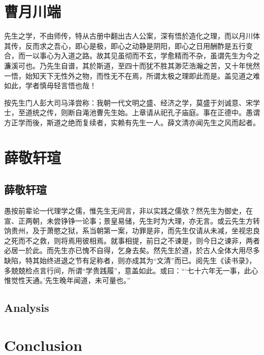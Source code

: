 \documentclass[
    author = Sweet Pastry,
    affiliation = Fudan University,
    column = onecolumn,
    ref = refDemo.bib,
    lang = cn
]{spArticle}
\begin{document}
    \section{曹月川端}
    先生之学，不由师传，特从古册中翻出古人公案，深有悟於造化之理，而以月川体其传，反而求之吾心，即心是极，即心之动静是阴阳，即心之日用酬酢是五行变合，而一以事心为入道之路。故其见虽彻而不玄，学愈精而不杂，虽谓先生为今之濂溪可也。乃先生自谱，其於斯道，至四十而犹不胜其渺茫浩瀚之苦，又十年恍然一悟，始知天下无性外之物，而性无不在焉，所谓太极之理即此而是。盖见道之难如此，学者慎毋轻言悟也哉！

    按先生门人彭大司马泽尝称：我朝一代文明之盛、经济之学，莫盛于刘诚意、宋学士，至道统之传，则断自渑池曹先生始。上章请从祀孔子庙庭。事在正德中。愚谓方正学而後，斯道之绝而复续者，实赖有先生一人。薛文清亦闻先生之风而起者。

    \section{薛敬轩瑄}
        \subsection{薛敬轩瑄}
            愚按前辈论一代理学之儒，惟先生无间言，非以实践之儒欤？然先生为御史，在宣、正两朝，未尝铮铮一论事；景皇易储，先生时为大理，亦无言。或云先生方转饷贵州，及于萧愍之狱，系当朝第一案，功罪是非，而先生仅请从未减，坐视忠良之死而不之救，则将焉用彼相焉。就事相提，前日之不谏是，则今日之谏非，两者必居一於此。而先生亦已愧不自得，乞身去矣。然先生於道，於古人全体大用尽多缺陷，特其始终进退之节有足称者，则亦成其为“文清”而已。阅先生《读书录》，多兢兢检点言行间，所谓“学贵践履”，意盖如此。或曰：“‘七十六年无一事，此心惟觉性天通。’先生晚年闻道，未可量也。”
        \subsection{Analysis}
            \lipsum[9-11]

    \section{Conclusion}
        \lipsum[12-14]
\end{document}
